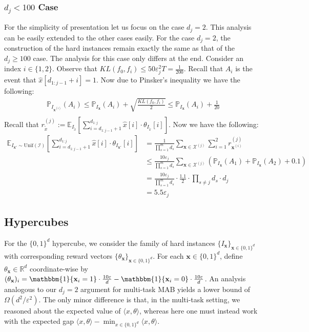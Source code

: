 \subsubsection{$d_j<100$ Case}

For the simplicity of presentation let us focus on the case $d_j=2$. This analysis can be easily extended to the other cases easily.
For the case $d_j=2$, the construction of the hard instances remain exactly the same as that of the $d_j\geq 100$ case. The analysis for this case only differs at the end. Consider an index $i\in\{1,2\}$. Observe that $KL(f_0,f_i)\leq50\varepsilon_j^2T=\frac{1}{200}$. Recall that $A_i$ is the event that $\widehat{x}[d_{1:j-1}+i]=1$. Now due to Pinsker's inequality we have the following:
    \begin{align*}
        \mathbb{P}_{I_{\mathbf{x}^{(i)}}}(A_i)\leq  \mathbb{P}_{I_{\mathbf{x}}}(A_i)+\sqrt{\frac{KL(f_0,f_i)}{2}}\leq \mathbb{P}_{I_{\mathbf{x}}}(A_i)+\frac{1}{20}\\
    \end{align*}
Recall that $r^{(j)}_{\tilde x}:=\mathbb{E}_{I_{\tilde x}}[\sum_{i=d_{1:j-1}+1}^{d_{1:j}}\widehat{x}[i]\cdot \theta_{I_{\tilde x}}[i]]$. Now we have the following:
    \begin{align*}
        \mathbb{E}_{I_{\mathbf{x}'}\sim \mathrm{Unif}(\mathcal{I})}[\sum_{i=d_{1:j-1}+1}^{d_{1:j}}\widehat{x}[i]\cdot \theta_{I_{\mathbf{x}'}}[i]]&=\frac{1}{\prod_{s=1}^md_s}\sum_{\mathbf{x}\in\mathcal{X}^{(j)}}\sum_{i=1}^{2} r^{(j)}_{\mathbf{x}^{(i)}} \\
        &\leq \frac{10\varepsilon_j}{\prod_{s=1}^md_s}\sum_{\mathbf{x}\in\mathcal{X}^{(j)}}\left(\mathbb{P}_{I_{\mathbf{x}}}(A_1)+\mathbb{P}_{I_{\mathbf{x}}}(A_2)+0.1\right)\\
        & = \frac{10\varepsilon_j}{\prod_{s=1}^md_s} \cdot\frac{1.1}{2}\cdot \prod_{s\neq j}d_s\cdot d_j \\
        & = 5.5\varepsilon_j
    \end{align*}

\subsection{Hypercubes}\label{appendix-hypercubes-lower-bound}
For the $\{0,1\}^d$ hypercube, we consider the family of hard instances $\{I_{\mathbf{x}}\}_{\mathbf{x}\in\{0,1\}^d}$ with corresponding reward vectors $\{\theta_{\mathbf{x}}\}_{\mathbf{x}\in\{0,1\}^d}$. For each $\mathbf{x}\in\{0,1\}^d$, define $\theta_{\mathbf{x}}\in\mathbb{R}^d$ coordinate-wise by
$(\theta_{\mathbf{x}})_i=\mathbbm{1}\{\mathbf{x}_i=1\}\cdot \frac{10\varepsilon}{d}-\mathbbm{1}\{\mathbf{x}_i=0\}\cdot \frac{10\varepsilon}{d}$.
An analysis analogous to our $d_j=2$ argument for multi-task MAB yields a lower bound of $\Omega(d^2/\varepsilon^2)$. The only minor difference is that, in the multi-task setting, we reasoned about the expected value of $\langle x,\theta\rangle$, whereas here one must instead work with the expected gap $\langle x,\theta\rangle-\min_{x\in\{0,1\}^d}\langle x,\theta\rangle$.


